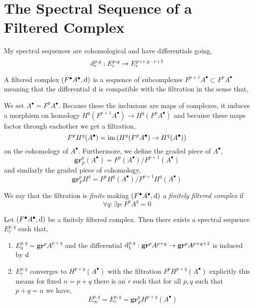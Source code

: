\documentclass[12pt]{article}
\newcommand{\Da}{\mbox{\usefont{T2A}{\rmdefault}{m}{n}\CYRD}}
\begin{document}
\section{The Spectral Sequence of a Filtered Complex} 

\renewcommand{\gr}{\mathbf{gr}}
\newcommand{\Tot}{\mathrm{Tot}}
\newcommand{\R}{\mathbf{R}}
\newcommand{\Hdr}{\mathcal{H}_{\dR}}
\newcommand{\GM}{\Da}
\newcommand{\ul}[1]{\underline{#1}}
\newcommand{\bH}{\mathbb{H}}

\begin{rmk}
My spectral sequences are cohomological and have differentials going,
\[ \mathrm{d}_r^{p,q} : E_r^{p,q} \to E_r^{p+r, q-r+1} \]
\end{rmk}


\begin{defn}
A filtered complex $(F^\bullet A^\bullet, \mathrm{d})$ is a sequence of subcomplexes $F^{p+1} A^\bullet \subset F^p A^\bullet$ meaning that the differential $\mathrm{d}$ is compatible with the filtration in the sense that,
\begin{center}
\end{center}
We set $A^\bullet = F^0 A^\bullet$. Because these the inclusions are maps of complexes, it induces a morphism on homology $H^q(F^{p+1} A^\bullet) \to H^q(F^{p} A^\bullet)$ and because these maps factor through eachother we get a filtration,
\[ F^p H^q(A^\bullet) = \operatorname{\mathrm{im}}{(H^q(F^p A^\bullet) \to H^q(A^\bullet))} \]
on the cohomology of $A^\bullet$. Furthermore, we define the graded piece of $A^\bullet$,
\[ \gr_F^p(A^\bullet) = F^p(A^\bullet) / F^{p+1}(A^\bullet) \]
and similarly the graded piece of cohomology,
\[ \gr_F^p H^q = F^p H^q(A^\bullet) / F^{p+1} H^q(A^\bullet) \]
\end{defn}

\begin{defn}
We say that the filtration is \textit{finite} making $(F^\bullet A^\bullet, \mathrm{d})$ a \textit{finitely filtered complex} if 
\[ \forall q : \exists p : F^p A^q = 0 \]
\end{defn}

\begin{prop}
Let $(F^\bullet A^\bullet, \mathrm{d})$ be a finitely filtered complex. Then there exists a spectral sequence $E^{p,q}_r$ such that,
\begin{enumerate}
\item $E^{p,q}_0 = \gr^p A^{p+q}$ and the differential $\d_1^{p,q} : \gr^{p} A^{p+q} \to \gr^{p} A^{p+q+1}$ is induced by $\mathrm{d}$ 
\item $E^{p,q}_r$ converges to $H^{p+q}(A^\bullet)$ with the filtration $F^p H^{p+q}(A^\bullet)$ explicitly this means for fixed $n = p+q$ there is an $r$ such that for all $p,q$ such that $p + q = n$ we have,
\[ E^{p,q}_{\infty} = E^{p,q}_r = \gr^p_F H^{p+q}(A^\bullet) \]
\end{enumerate}
\end{prop}
\end{document}
